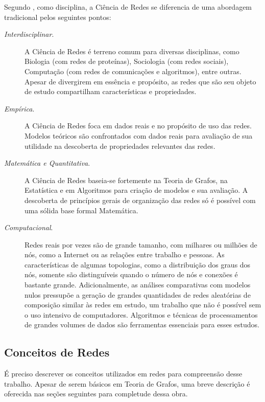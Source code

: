 \documentclass[12pt,a4paper]{article}
\theoremstyle{hypo}
\begin{document}
Segundo , como disciplina, a Ciência de Redes se diferencia de uma abordagem tradicional pelos seguintes pontos:

\begin{description}
	\item[\textit{Interdisciplinar}.] A Ciência de Redes é terreno comum para diversas disciplinas, como Biologia (com redes de proteínas), Sociologia (com redes sociais), Computação (com redes de comunicações e algoritmos), entre outras. Apesar de divergirem em essência e propósito, as redes que são seu objeto de estudo compartilham características e propriedades.
    
    \item[\textit{Empírica}.] A Ciência de Redes foca em dados reais e no propósito de uso das redes. Modelos teóricos são confrontados com dados reais para avaliação de sua utilidade na descoberta de propriedades relevantes das redes.
    
    \item[\textit{Matemática e Quantitativa}.] A Ciência de Redes baseia-se fortemente na Teoria de Grafos, na Estatística e em Algoritmos para criação de modelos e sua avaliação. A descoberta de princípios gerais de organização das redes só é possível com uma sólida base formal Matemática.
    
    \item[\textit{Computacional}.] Redes reais por vezes são de grande tamanho, com milhares ou milhões de nós, como a Internet ou as relações entre trabalho e pessoas. As características de algumas topologias, como a distribuição dos graus dos nós, somente são distinguíveis quando o número de nós e conexões é bastante grande. Adicionalmente, as análises comparativas com modelos nulos pressupõe a geração de grandes quantidades de redes aleatórias de composição similar às redes em estudo, um trabalho que não é possível sem o uso intensivo de computadores. Algoritmos e técnicas de processamentos de grandes volumes de dados são ferramentas essenciais para esses estudos.
\end{description}

\subsection{Conceitos de Redes}

É preciso descrever os conceitos utilizados em redes para compreensão desse trabalho. Apesar de serem básicos em Teoria de Grafos, uma breve descrição é oferecida nas seções seguintes para completude dessa obra.
\end{document}
